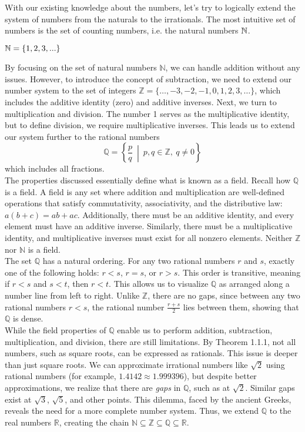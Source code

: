 With our existing knowledge about the numbers, let's try to logically extend the system of numbers from the naturals to the irrationals. The most intuitive set of numbers is the set of counting numbers, i.e. the natural numbers $\mathbb{N}$.

\begin{center}
    $\mathbb{N} = \{1, 2, 3, ...\}$
\end{center}

By focusing on the set of natural numbers \( \mathbb{N} \), we can handle addition without any issues. However, to introduce the concept of subtraction, we need to extend our number system to the set of integers 
\( \mathbb{Z} = \{ \dots, -3, -2, -1, 0, 1, 2, 3, \dots \} \), which includes the additive identity (zero) and additive inverses. Next, we turn to multiplication and division. The number 1 serves as the multiplicative identity, but to define division, we require multiplicative inverses. This leads us to extend our system further to the rational numbers
\[
\mathbb{Q} = \left\{ \frac{p}{q} \ \middle|\ p, q \in \mathbb{Z},\ q \neq 0 \right\}
\]
which includes all fractions. \\

The properties discussed essentially define what is known as a field. Recall how $\mathbb{Q}$ is a field. A field is any set where addition and multiplication are well-defined operations that satisfy commutativity, associativity, and the distributive law: \( a(b + c) = ab + ac \). Additionally, there must be an additive identity, and every element must have an additive inverse. Similarly, there must be a multiplicative identity, and multiplicative inverses must exist for all nonzero elements. Neither \( \mathbb{Z} \) nor \( \mathbb{N} \) is a field. \\

The set $\mathbb{Q}$ has a natural ordering. For any two rational numbers $r$ and $s$, exactly one of the following holds: $r < s$, $r = s$, or $r > s$. This order is transitive, meaning if $r < s$ and $s < t$, then $r < t$. This allows us to visualize $\mathbb{Q}$ as arranged along a number line from left to right. Unlike $\mathbb{Z}$, there are no gaps, since between any two rational numbers $r < s$, the rational number $\frac{r+s}{2}$ lies between them, showing that $\mathbb{Q}$ is dense. \\

While the field properties of $\mathbb{Q}$ enable us to perform addition, subtraction, multiplication, and division, there are still limitations. By Theorem 1.1.1, not all numbers, such as square roots, can be expressed as rationals. This issue is deeper than just square roots. We can approximate irrational numbers like $\sqrt{2}$ using rational numbers (for example, $1.4142 \approx 1.999396$), but despite better approximations, we realize that there are \textit{gaps} in $\mathbb{Q}$, such as at $\sqrt{2}$. Similar gaps exist at $\sqrt{3}$, $\sqrt{5}$, and other points. This dilemma, faced by the ancient Greeks, reveals the need for a more complete number system. Thus, we extend $\mathbb{Q}$ to the real numbers $\mathbb{R}$, creating the chain $\mathbb{N} \subseteq \mathbb{Z} \subseteq \mathbb{Q} \subseteq \mathbb{R}$. \\

